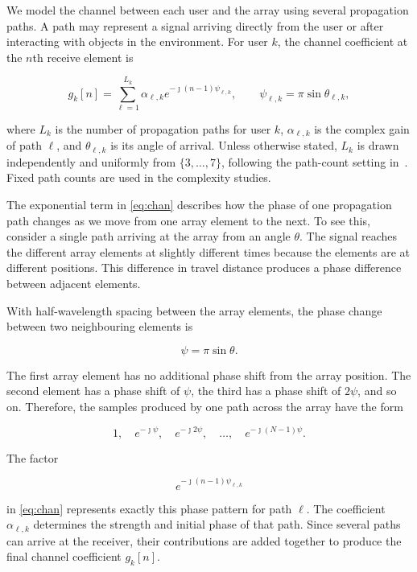 \documentclass[journal]{IEEEtran}
\begin{document}
We model the channel between each user and the array using several
propagation paths. A path may represent a signal arriving directly from the
user or after interacting with objects in the environment. For user $k$,
the channel coefficient at the $n$th receive element is

\begin{equation}
g_k[n]
=
\sum_{\ell=1}^{L_k}
\alpha_{\ell,k}
e^{-\jmath(n-1)\psi_{\ell,k}},
\qquad
\psi_{\ell,k}
=
\pi\sin\theta_{\ell,k},
\label{eq:chan}
\end{equation}

where $L_k$ is the number of propagation paths for user $k$,
$\alpha_{\ell,k}$ is the complex gain of path $\ell$, and
$\theta_{\ell,k}$ is its angle of arrival. Unless otherwise stated, $L_k$ is drawn independently and uniformly
from $\{3,\ldots,7\}$, following the path-count setting
in~\cite{xu2025}. Fixed path counts are used in the complexity studies.

The exponential term in \eqref{eq:chan} describes how the phase of one
propagation path changes as we move from one array element to the next.
To see this, consider a single path arriving at the array from an angle
$\theta$. The signal reaches the different array elements at slightly
different times because the elements are at different positions. This
difference in travel distance produces a phase difference between adjacent
elements.

With half-wavelength spacing between the array elements, the phase change
between two neighbouring elements is

\begin{equation}
\psi
=
\pi\sin\theta.
\end{equation}

The first array element has no additional phase shift from the array
position. The second element has a phase shift of $\psi$, the third has a
phase shift of $2\psi$, and so on. Therefore, the samples produced by one
path across the array have the form

\begin{equation}
1,\quad
e^{-\jmath\psi},\quad
e^{-\jmath2\psi},\quad
\ldots,\quad
e^{-\jmath(N-1)\psi}.
\end{equation}

The factor

\begin{equation}
e^{-\jmath(n-1)\psi_{\ell,k}}
\end{equation}

in \eqref{eq:chan} represents exactly this phase pattern for path $\ell$.
The coefficient $\alpha_{\ell,k}$ determines the strength and initial
phase of that path. Since several paths can arrive at the receiver, their
contributions are added together to produce the final channel coefficient
$g_k[n]$.
\end{document}
